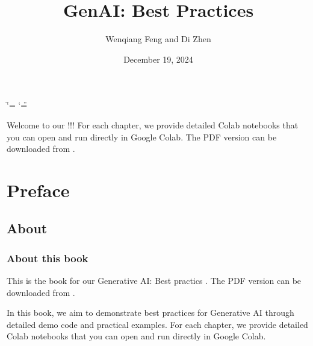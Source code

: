 \documentclass[letterpaper,11pt,english]{sphinxmanual}
\title{GenAI: Best Practices}
\date{December 19, 2024}
\author{Wenqiang Feng and Di Zhen}
\begin{document}
\ifdefined\shorthandoff
  \ifnum\catcode`\=\string=\active\shorthandoff{=}\fi
  \ifnum\catcode`\"=\active{}\fi
\fi

\pagestyle{empty}
\sphinxmaketitle
\pagestyle{plain}
\sphinxtableofcontents
\pagestyle{normal}
\label{\detokenize{index::doc}}\label{\detokenize{index:index}}\begin{quote}

\begin{figure}[htbp]
\centering

\noindent{}
\end{figure}
\end{quote}

\sphinxAtStartPar
Welcome to our !!! For each chapter, we provide detailed
Colab notebooks  that you can open and run directly in Google Colab.
The PDF version can be downloaded from .



\sphinxstepscope


\chapter{Preface}
\label{\detokenize{preface:id1}}\label{\detokenize{preface::doc}}

\section{About}
\label{\detokenize{preface:about}}

\subsection{About this book}
\label{\detokenize{preface:about-this-book}}
\sphinxAtStartPar
This is the book for our Generative AI: Best practics .
The PDF version can be downloaded from .

\sphinxAtStartPar
In this book, we aim to demonstrate best practices for Generative AI
through detailed demo code and practical examples. For each chapter, we provide detailed
Colab notebooks  that you can open and run directly in Google Colab.
\end{document}
